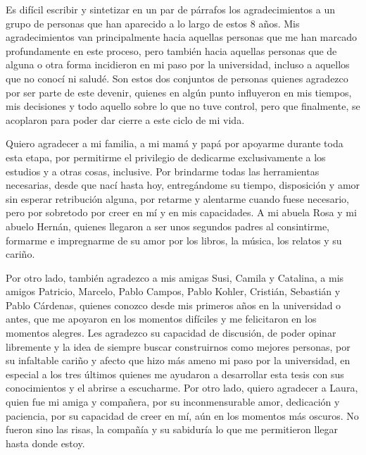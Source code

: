 
Es difícil escribir y sintetizar en un par de párrafos los agradecimientos a un grupo de personas que han aparecido a lo largo de estos 8 años. Mis agradecimientos van principalmente hacia aquellas personas que me han marcado profundamente en este proceso, pero también hacia aquellas personas que de alguna o otra forma incidieron en mi paso por la universidad, incluso a aquellos que no conocí ni saludé. Son estos dos conjuntos de personas quienes agradezco por ser parte de este devenir, quienes en algún punto influyeron en mis tiempos, mis decisiones y todo aquello sobre lo que no tuve control, pero que finalmente, se acoplaron para poder dar cierre a este ciclo de mi vida.

Quiero agradecer a mi familia, a mi mamá y papá por apoyarme durante toda esta etapa, por permitirme el privilegio de dedicarme exclusivamente a los estudios y a otras cosas, inclusive. Por brindarme todas las herramientas necesarias, desde que nací hasta hoy, entregándome su tiempo, disposición y amor sin esperar retribución alguna, por retarme y alentarme cuando fuese necesario, pero por sobretodo por creer en mí y en mis capacidades. A mi abuela Rosa y mi abuelo Hernán, quienes llegaron a ser unos segundos padres al consintirme, formarme e impregnarme de su amor por los libros, la música, los relatos y su cariño.

Por otro lado, también agradezco a mis amigas Susi, Camila y Catalina, a mis amigos Patricio, Marcelo, Pablo Campos, Pablo Kohler, Cristián, Sebastián y Pablo Cárdenas, quienes conozco desde mis primeros años en la universidad o antes, que me apoyaron en los momentos difíciles y me felicitaron en los momentos alegres. Les agradezco su capacidad de discusión, de poder opinar libremente y la idea de siempre buscar construirnos como mejores personas, por su infaltable cariño y afecto que hizo más ameno mi paso por la universidad, en especial a los tres últimos quienes me ayudaron a desarrollar esta tesis con sus conocimientos y el abrirse a escucharme. Por otro lado, quiero agradecer a Laura, quien fue mi amiga y compañera, por su inconmensurable amor, dedicación y paciencia, por su capacidad de creer en mí, aún en los momentos más oscuros. No fueron sino las risas, la compañía y su sabiduría lo que me permitieron llegar hasta donde estoy.

